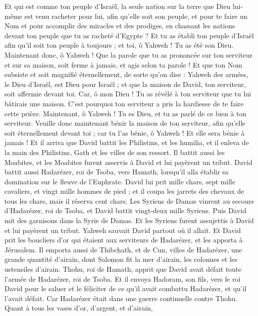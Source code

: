 \begin{multicols}{2}
Et qui est comme ton peuple d'Israël, la seule nation sur la terre que Dieu lui-même est venu racheter pour lui, afin qu'elle soit son peuple, et pour te faire un Nom et pour accomplir des miracles et des prodiges, en chassant les nations devant ton peuple que tu as racheté d'Egypte ?
Et tu as établi ton peuple d'Israël afin qu’il soit ton peuple à toujours ; et toi, ô Yahweh ! Tu as été son Dieu.
Maintenant donc, ô Yahweh ! Que la parole que tu as prononcée sur ton serviteur et sur sa maison, soit ferme à jamais, et agis selon ta parole !
Et que ton Nom subsiste et soit magnifié éternellement, de sorte qu'on dise : Yahweh des armées, le Dieu d'Israël, est Dieu pour Israël ; et que la maison de David, ton serviteur, soit affermie devant toi.
Car, ô mon Dieu ! Tu as révélé à ton serviteur que tu lui bâtirais une maison. C'est pourquoi ton serviteur a pris la hardiesse de te faire cette prière.
Maintenant, ô Yahweh ! Tu es Dieu, et tu as parlé de ce bien à ton serviteur.
Veuille donc maintenant bénir la maison de ton serviteur, afin qu'elle soit éternellement devant toi ; car tu l'as bénie, ô Yahweh ! Et elle sera bénie à jamais !
\VerseOne{}Et il arriva que David battit les Philistins, et les humilia, et il enleva de la main des Philistins, Gath et les villes de son ressort.
Il battit aussi les Moabites, et les Moabites furent asservis à David et lui payèrent un tribut.
David battit aussi Hadarézer, roi de Tsoba, vers Hamath, lorsqu’il alla établir sa domination sur le fleuve de l'Euphrate.
David lui prit mille chars, sept mille cavaliers, et vingt mille hommes de pied ; et il coupa les jarrets des chevaux de tous les chars, mais il réserva cent chars.
Les Syriens de Damas vinrent au secours d’Hadarézer, roi de Tsoba, et David battit vingt-deux mille Syriens.
Puis David mit des garnisons dans la Syrie de Damas. Et les Syriens furent assujettis à David et lui payèrent un tribut. Yahweh sauvait David partout où il allait.
Et David prit les boucliers d'or qui étaient aux serviteurs de Hadarézer, et les apporta à Jérusalem.
Il emporta aussi de Thibchath, et de Cun, villes de Hadarézer, une grande quantité d'airain, dont Salomon fit la mer d'airain, les colonnes et les ustensiles d'airain.
Thohu, roi de Hamath, apprit que David avait défait toute l'armée de Hadarézer, roi de Tsoba.
Et il envoya Hadoram, son fils, vers le roi David pour le saluer et le féliciter de ce qu'il avait combattu Hadarézer, et qu'il l'avait défait. Car Hadarézer était dans une guerre continuelle contre Thohu. Quant à tous les vases d'or, d'argent, et d'airain,

\end{multicols}
